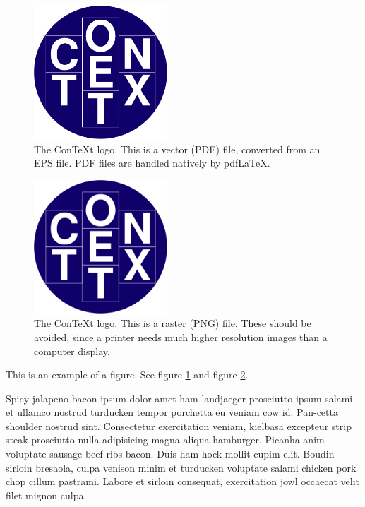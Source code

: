 \documentclass{article}
\begin{document}
\begin{figure}
  \centering
  \includegraphics[width=5cm]{images/ConTeXt_Unofficial_Logo} %
  \caption{The Con\TeX{t} logo. This is a vector (PDF) file, converted from an EPS file. PDF files are handled natively by pdf\LaTeX{}.}
  \label{fig-vector}
\end{figure}

\begin{figure} %
  \centering
  \includegraphics[width=5cm]{images/ConTeXt_Unofficial_Logo.png}
  \caption{The Con\TeX{t} logo. This is a raster (PNG) file. These should be avoided, since a printer needs much higher resolution images than a computer display.}
  \label{fig-raster}
\end{figure}

This is an example of a figure. See figure \ref{fig-vector} and figure \ref{fig-raster}.

 Spicy jalapeno bacon ipsum dolor amet ham landjaeger prosciutto ipsum salami et ullamco nostrud turducken tempor porchetta eu veniam cow id. Pan-cetta shoulder nostrud sint. Consectetur exercitation veniam, kielbasa excepteur strip steak prosciutto nulla adipisicing magna aliqua hamburger. Picanha anim voluptate sausage beef ribs bacon. Duis ham hock mollit cupim elit. Boudin sirloin bresaola, culpa venison minim et turducken voluptate salami chicken pork chop cillum pastrami. Labore et sirloin consequat, exercitation jowl occaecat velit filet mignon culpa.
\end{document}
